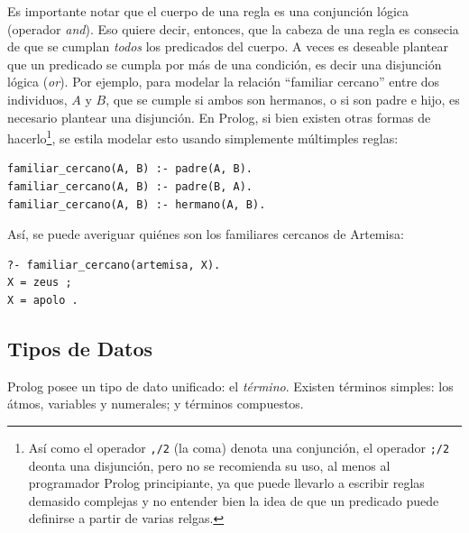 \documentclass[12pt,titlepage]{article}
\begin{document}
Es importante notar que el cuerpo de una regla es una conjunción lógica (operador \emph{and}). Eso quiere decir, entonces, que la cabeza de una regla es consecia de que se cumplan \emph{todos} los predicados del cuerpo. A veces es deseable plantear que un predicado se cumpla por más de una condición, es decir una disjunción lógica (\emph{or}). Por ejemplo, para modelar la relación ``familiar cercano'' entre dos individuos, $A$ y $B$, que se cumple si ambos son hermanos, o si son padre e hijo, es necesario plantear una disjunción. En Prolog, si bien existen otras formas de hacerlo\footnote{Así como el operador \lstinline|,/2| (la coma) denota una conjunción, el operador \lstinline|;/2| deonta una disjunción, pero no se recomienda su uso, al menos al programador Prolog principiante, ya que puede llevarlo a escribir reglas demasido complejas y no entender bien la idea de que un predicado puede definirse a partir de varias relgas.}, se estila modelar esto usando simplemente múltimples reglas:
\begin{lstlisting}
familiar_cercano(A, B) :- padre(A, B).
familiar_cercano(A, B) :- padre(B, A).
familiar_cercano(A, B) :- hermano(A, B).
\end{lstlisting}

Así, se puede averiguar quiénes son los familiares cercanos de Artemisa:
\begin{lstlisting}
?- familiar_cercano(artemisa, X).
X = zeus ;
X = apolo .
\end{lstlisting}


\subsection{Tipos de Datos}
\label{sec:datos}

Prolog posee un tipo de dato unificado: el \emph{término}. Existen términos simples: los átmos, variables y numerales; y términos compuestos.
\end{document}
